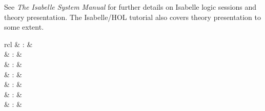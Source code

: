 \begin{isabellebody}
\begin{isamarkuptext}
  \medskip See \emph{The Isabelle System Manual} \cite{isabelle-sys}
  for further details on Isabelle logic sessions and theory
  presentation.  The Isabelle/HOL tutorial \cite{isabelle-hol-book}
  also covers theory presentation to some extent.%
\end{isamarkuptext}%
\isamarkuptrue%
%
\isamarkuptrue%
%
\begin{isamarkuptext}%
\begin{matharray}{rcl}
    \hypertarget{command.header}{\hyperlink{command.header}{\mbox{}}} & : &  \\[0.5ex]
    \hypertarget{command.chapter}{\hyperlink{command.chapter}{\mbox{}}} & : &  \\
    \hypertarget{command.section}{\hyperlink{command.section}{\mbox{}}} & : &  \\
    \hypertarget{command.subsection}{\hyperlink{command.subsection}{\mbox{}}} & : &  \\
    \hypertarget{command.subsubsection}{\hyperlink{command.subsubsection}{\mbox{}}} & : &  \\
    \hypertarget{command.text}{\hyperlink{command.text}{\mbox{}}} & : &  \\
    \hypertarget{command.text-raw}{\hyperlink{command.text-raw}{\mbox{}}} & : &  \\[0.5ex]

\end{matharray}
\end{isamarkuptext}
\end{isabellebody}
